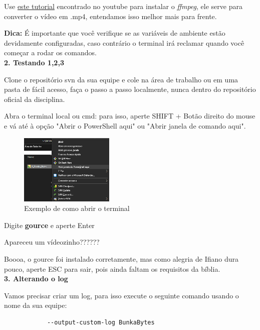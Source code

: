 Use \href{https://www.youtube.com/watch?v=WMEyeu1FKhw}{este tutorial} encontrado no \gls{youtube} para instalar o \textit{ffmpeg}, ele serve para converter o vídeo em .mp4, entendamos isso melhor mais para frente.

\textbf{Dica:} É importante que você verifique se as variáveis de ambiente estão devidamente configuradas, caso contrário o terminal irá reclamar quando você começar a rodar os comandos.\\

\textbf{2. Testando 1,2,3}

Clone o repositório \acs{svn} da sua equipe e cole na área de trabalho ou em uma pasta de fácil acesso, faça o passo a passo localmente, nunca dentro do repositório oficial da disciplina.

Abra o terminal local ou cmd: para isso, aperte SHIFT + Botão direito do mouse e vá até à opção "Abrir o PowerShell aqui" ou "Abrir janela de comando aqui".

\begin{figure}[htb]
        \centering
        \caption{Exemplo de como abrir o terminal}
        \includegraphics[width=0.4\textwidth]{anexos/Imagens_Blog/exemplo_abrir_terminal.png}
        \end{figure}
        \FloatBarrier

Digite \textbf{gource} e aperte Enter

Apareceu um vídeozinho?????? 

Boooa, o \gls{gource} foi instalado corretamente, mas como alegria de Ifiano dura pouco, aperte ESC para sair, pois ainda faltam os requisitos da bíblia.\\

\textbf{3. Alterando o log}

Vamos precisar criar um log, para isso execute o seguinte comando usando o nome da sua equipe:
\lstset{language=Fortran,
             basicstyle=\ttfamily\small,
             showstringspaces=false
    }
        \begin{lstlisting} 
            --output-custom-log BunkaBytes
        \end{lstlisting}
        
